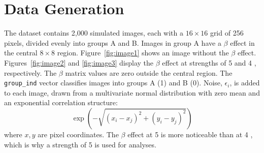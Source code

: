 \documentclass[12pt]{article}
\begin{document}
\section*{Data Generation}

The dataset contains 2,000 simulated images, each with a \( 16 \times 16 \) grid of 256 pixels, divided evenly into groups A and B. Images in group A have a \( \beta \) effect in the central \( 8 \times 8 \) region. Figure~\ref{fig:image1} shows an image without the \( \beta \) effect. Figures~\ref{fig:image2} and \ref{fig:image3} display the \( \beta \) effect at strengths of 5 and 4 , respectively. The \( \beta \) matrix values are zero outside the central region. The \texttt{group\_ind} vector classifies images into groups A (1) and B (0). Noise, \( \epsilon_i \), is added to each image, drawn from a multivariate normal distribution with zero mean and an exponential correlation structure:
\[
  \exp \left(-\sqrt{\left(x_i-x_j\right)^2+\left(y_i-y_j\right)^2}\right)
\]
where \(x, y\) are pixel coordinates. The \(\beta\) effect at 5 is more noticeable than at 4 , which is why a strength of 5 is used for analyses.


\end{document}
